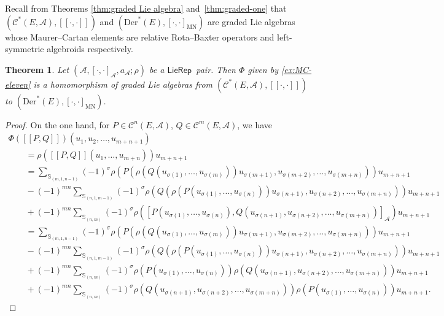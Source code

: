 \documentclass[pdftex]{sigma}%
\numberwithin{equation}{section}
\newtheorem{thm}{Theorem}[section]
\newcommand{\huaA}{\mathcal{A}}
\newcommand{\huaC}{\mathcal{C}}
\newcommand{\Courant}[1]{\left[\!\left[ #1\right]\!\right]}
\newcommand{\Der}{\mathrm{Der}}
\newcommand{\MN}{\mathrm{MN}}
\newcommand{\LP}{$\mathsf{LieRep}$~}
\begin{document}
Recall from Theorems \ref{thm:graded Lie algebra} and~\ref{thm:graded-one} that $(\huaC^*(E,\huaA),\Courant{\cdot,\cdot})$ and $(\Der^*(E),[\cdot,\cdot]_{\MN})$ are graded Lie algebras whose Maurer--Cartan elements are relative Rota--Baxter operators and left-symmetric algebroids respectively.
\begin{thm}\label{thm:homomorphism graded Lie}
Let $(\huaA,[\cdot,\cdot]_\huaA,a_\huaA;\rho)$ be a \LP pair. Then $\Phi $ given by \eqref{ex:MC-eleven} is a homomorphism of graded Lie algebras from $(\huaC^*(E,\huaA),\Courant{\cdot,\cdot})$ to $(\Der^*(E),[\cdot,\cdot]_{\MN})$.
\end{thm}
\begin{proof}
On the one hand, for $P\in\huaC^{n}(E,\huaA)$, $Q\in \huaC^{m}(E,\huaA)$, we have
\begin{gather*}
\Phi(\Courant{P,Q})(u_1,u_2,\dots,u_{m+n+1})
\\ \qquad
{}=\rho(\Courant{P,Q}(u_1,\dots,u_{m+n}))u_{m+n+1}
\\ \qquad
{}=\sum_{\mathbb{S}_{(m,1,n-1)}}(-1)^{\sigma}
\rho(P(\rho(Q(u_{\sigma(1)},\dots,u_{\sigma(m)}))u_{\sigma(m+1)},u_{\sigma(m+2)}, \dots,u_{\sigma(m+n)}))u_{m+n+1}
\\ \qquad
{}-\!(-1)^{mn}\!\!\!\!\!\!\sum_{\mathbb{S}_{(n,1,m-1)}}\!\!\!\!\!(-1)^{\sigma}
\rho(Q(\rho(P(u_{\sigma(1)},\dots,u_{\sigma(n)}))u_{\sigma(n+1)},u_{\sigma(n+2)}, \dots,u_{\sigma(m+n)}))u_{m+n+1}
\\ \qquad
{}+\!(-1)^{mn}\!\!\sum_{\mathbb{S}_{(n,m)}}\!\!(-1)^{\sigma}\!
\rho([P(u_{\sigma(1)},\dots,u_{\sigma(n)}),Q(u_{\sigma(n+1)},u_{\sigma(n+2)}, \dots,u_{\sigma(m+n)})]_{\huaA})u_{m+n+1}
\\ \qquad
{}=\sum_{\mathbb{S}_{(m,1,n-1)}}(-1)^{\sigma}
\rho(P(\rho(Q(u_{\sigma(1)},\dots,u_{\sigma(m)}))u_{\sigma(m+1)},u_{\sigma(m+2)}, \dots,u_{\sigma(m+n)}))u_{m+n+1}
\\ \qquad
{}-\!(-1)^{mn}\!\!\!\!\!\!\sum_{\mathbb{S}_{(n,1,m-1)}}\!\!\!\!\!(-1)^{\sigma}
\rho(Q(\rho(P(u_{\sigma(1)},\dots,u_{\sigma(n)}))u_{\sigma(n+1)},u_{\sigma(n+2)}, \dots,u_{\sigma(m+n)}))u_{m+n+1}
\\ \qquad
{}+\!(-1)^{mn}\sum_{\mathbb{S}_{(n,m)}}\!(-1)^{\sigma}
\rho(P(u_{\sigma(1)},\dots,u_{\sigma(n)}))\rho(Q(u_{\sigma(n+1)},u_{\sigma(n+2)}, \dots,u_{\sigma(m+n)}))u_{m+n+1}
\\ \qquad
{}+\!(-1)^{mn}\!\!\sum_{\mathbb{S}_{(n,m)}}\!(-1)^{\sigma}
\rho(Q(u_{\sigma(n+1)},u_{\sigma(n+2)},\dots,u_{\sigma(m+n)}))\rho(P(u_{\sigma(1)}, \dots,u_{\sigma(n)}))u_{m+n+1}.
\end{gather*}

\end{proof}
\end{document}
